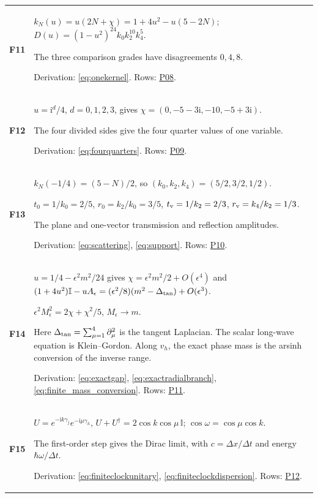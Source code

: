 \documentclass[aps,prx,onecolumn,10pt,notitlepage,nofootinbib,longbibliography]{revtex4-2}
\numberwithin{equation}{section}
\numberwithin{table}{section}
\newcommand{\Id}{\mathbb I}
\newcommand{\ii}{\mathrm i}
\begin{document}
\begin{longtable}{@{}>{\raggedright\arraybackslash}p{}>{\raggedright\arraybackslash}p{}@{}}
\hypertarget{formula-F11}{}\textbf{F11}\label{formula:F11} & $k_N(u)=u(2N+\chi)=1+4u^2-u(5-2N)$; $D(u)=(1-u^2)^{24}k_0k_2^{10}k_4^5$.\par
The three comparison grades have disagreements $0,4,8$.\par
Derivation: \eqref{eq:onekernel}. Rows: \hyperlink{row-P08}{P08}.\\[7pt]
\hypertarget{formula-F12}{}\textbf{F12}\label{formula:F12} & $u=\ii^d/4$, $d=0,1,2,3$, gives $\chi=(0,-5-3\ii,-10,-5+3\ii)$.\par
The four divided sides give the four quarter values of one variable.\par
Derivation: \eqref{eq:fourquarters}. Rows: \hyperlink{row-P09}{P09}.\\[7pt]
\hypertarget{formula-F13}{}\textbf{F13}\label{formula:F13} & $k_N(-1/4)=(5-N)/2$, so $(k_0,k_2,k_4)=(5/2,3/2,1/2)$.\par $t_0=1/k_0=2/5$, $r_0=k_2/k_0=3/5$, $t_{\rm v}=1/k_2=2/3$, $r_{\rm v}=k_4/k_2=1/3$.\par
The plane and one-vector transmission and reflection amplitudes.\par
Derivation: \eqref{eq:scattering}, \eqref{eq:support}. Rows: \hyperlink{row-P10}{P10}.\\[7pt]
\hypertarget{formula-F14}{}\textbf{F14}\label{formula:F14} & $u=1/4-\epsilon^2m^2/24$ gives $\chi=\epsilon^2m^2/2+O(\epsilon^4)$ and $(1+4u^2)\Id-uA_\epsilon=(\epsilon^2/8)(m^2-\Delta_{\rm tan})+O(\epsilon^3)$.\par $\epsilon^2M_\epsilon^2=2\chi+\chi^2/5$, $M_\epsilon\to m$.\par
Here $\Delta_{\rm tan}=\sum_{\mu=1}^4\partial_\mu^2$ is the tangent Laplacian. The scalar long-wave equation is Klein--Gordon. Along $v_h$, the exact phase mass is the arsinh conversion of the inverse range.\par
Derivation: \eqref{eq:exactgap}, \eqref{eq:exactradialbranch}, \eqref{eq:finite_mass_conversion}. Rows: \hyperlink{row-P11}{P11}.\\[7pt]
\hypertarget{formula-F15}{}\textbf{F15}\label{formula:F15} & $U=e^{-\ii k\gamma_j}e^{-\ii\mu\gamma_h}$, $U+U^\dagger=2\cos k\cos\mu\,\Id$; $\cos\omega=\cos\mu\cos k$.\par
The first-order step gives the Dirac limit, with $c=\Delta x/\Delta t$ and energy $\hbar\omega/\Delta t$.\par
Derivation: \eqref{eq:finiteclockunitary}, \eqref{eq:finiteclockdispersion}. Rows: \hyperlink{row-P12}{P12}.\\[7pt]

\end{longtable}
\end{document}
